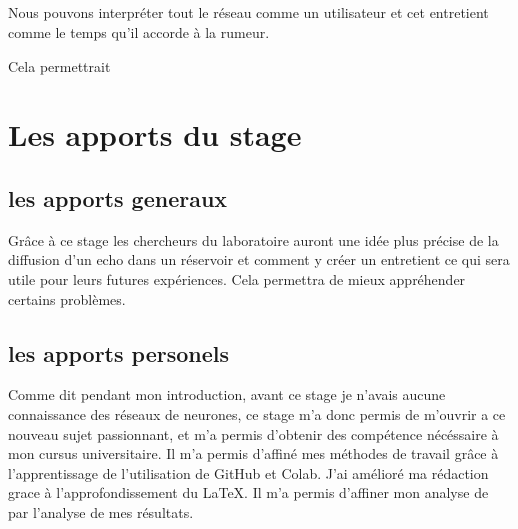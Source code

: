 \subsection{}

Nous pouvons interpréter tout le réseau comme un utilisateur et cet entretient comme le temps qu'il accorde à la rumeur.

Cela permettrait
\section{Les apports du stage}
\subsection{les apports generaux}
Grâce à ce stage les chercheurs du laboratoire auront une idée plus précise de la diffusion d'un echo dans un réservoir et comment y créer un entretient ce qui sera utile pour leurs futures expériences. Cela permettra de mieux appréhender certains problèmes.
\subsection{les apports personels}
Comme dit pendant mon introduction, avant ce stage je n'avais aucune connaissance des réseaux de neurones, ce stage m'a donc permis de m'ouvrir a ce nouveau sujet passionnant, et m'a permis d'obtenir des compétence nécéssaire à mon cursus universitaire. Il m'a permis d'affiné mes méthodes de travail grâce à l'apprentissage de l'utilisation de GitHub et Colab. J'ai amélioré ma rédaction grace à l'approfondissement
du LaTeX. Il m'a permis d'affiner mon analyse de par l'analyse de mes résultats.
